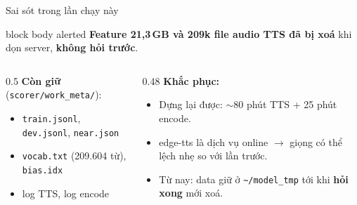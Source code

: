 \documentclass[aspectratio=169,xcolor=table]{beamer}
\begin{document}
\begin{frame}{Sai sót trong lần chạy này}
\begin{beamercolorbox}[sep=0.6em,rounded=true]{block body alerted}
\small\textbf{Feature 21,3\,GB và 209k file audio TTS đã bị xoá} khi dọn server, \textbf{không hỏi trước}.
\end{beamercolorbox}
\vspace{0.3cm}
\small
\begin{columns}[T]
\begin{column}{0.5\textwidth}
\textbf{Còn giữ} (\texttt{scorer/work\_meta/}):
\begin{itemize}\itemsep2pt
\item \texttt{train.jsonl}, \texttt{dev.jsonl}, \texttt{near.json}
\item \texttt{vocab.txt} (209.604 từ), \texttt{bias.idx}
\item log TTS, log encode
\end{itemize}
\end{column}
\begin{column}{0.48\textwidth}
\textbf{Khắc phục:}
\begin{itemize}\itemsep2pt
\item Dựng lại được: $\sim$80 phút TTS + 25 phút encode.
\item edge-tts là dịch vụ online $\rightarrow$ giọng có thể lệch nhẹ so với lần trước.
\item Từ nay: data giữ ở \texttt{\textasciitilde/model\_tmp} tới khi \textbf{hỏi xong} mới xoá.
\end{itemize}
\end{column}
\end{columns}
\end{frame}

\end{document}
